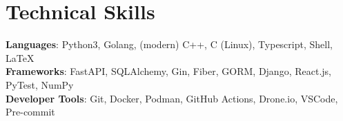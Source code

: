 \documentclass[letterpaper,11pt]{article}
\begin{document}
\section{Technical Skills}
 \begin{itemize}[leftmargin=0.15in, label={}]
    \small{\item{
     \textbf{Languages}{: Python3, Golang, (modern) C++, C (Linux), Typescript, Shell, \LaTeX} \\
     \textbf{Frameworks}{: FastAPI, SQLAlchemy, Gin, Fiber, GORM, Django, React.js, PyTest, NumPy} \\
     \textbf{Developer Tools}{: Git, Docker, Podman, GitHub Actions, Drone.io, VSCode, Pre-commit} \\
    }}
 \end{itemize}


\end{document}

